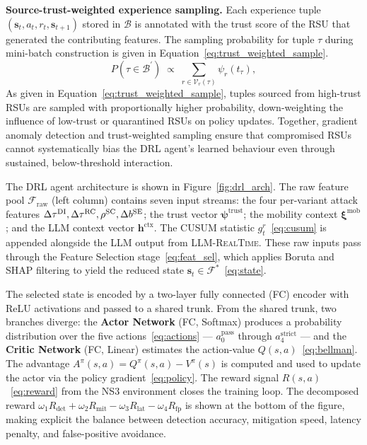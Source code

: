 \textbf{Source-trust-weighted experience sampling.}
Each experience tuple $(\mathbf{s}_t, a_t, r_t,
\mathbf{s}_{t+1})$ stored in $\mathcal{B}$ is annotated with
the trust score of the RSU that generated the contributing
features. The sampling probability for tuple $\tau$ during
mini-batch construction is given in
Equation~\eqref{eq:trust_weighted_sample}.
%
\begin{equation}
  P(\tau \in \mathcal{B}^{\prime}) \;\propto\;
    \sum_{r \in \mathcal{V}_r(\tau)} \psi_r(t_\tau),
  \label{eq:trust_weighted_sample}
\end{equation}
%
As given in Equation~\eqref{eq:trust_weighted_sample}, tuples
sourced from high-trust RSUs are sampled with proportionally
higher probability, down-weighting the influence of low-trust
or quarantined RSUs on policy updates. Together, gradient
anomaly detection and trust-weighted sampling ensure that
compromised RSUs cannot systematically bias the DRL agent's
learned behaviour even through sustained, below-threshold
interaction.




The DRL agent architecture is shown in
Figure~\ref{fig:drl_arch}. The raw feature pool
$\mathcal{F}_{\mathrm{raw}}$ (left column) contains seven input
streams: the four per-variant attack features
$\Delta\tau^{\mathrm{DI}}, \Delta\tau^{\mathrm{RC}},
\rho^{\mathrm{SC}}, \\\Delta b^{\mathrm{SE}}$; the trust vector
$\boldsymbol{\psi}^{\mathrm{trust}}$; the mobility context
$\boldsymbol{\xi}^{\mathrm{mob}}$; and the LLM context vector
$\mathbf{h}^{\mathrm{ctx}}$. The CUSUM statistic
$g_t^r$~\eqref{eq:cusum} is appended alongside the LLM output
from \textsc{LLM-RealTime}. These raw inputs pass through the
Feature Selection stage~\eqref{eq:feat_sel}, which applies
Boruta and SHAP filtering to yield the reduced state
$\mathbf{s}_t \in \mathcal{F}^*$~\eqref{eq:state}.

The selected state is encoded by a two-layer fully connected
(FC) encoder with ReLU activations and passed to a shared
trunk. From the shared trunk, two branches diverge: the
\textbf{Actor Network} (FC, Softmax) produces a probability
distribution over the five actions~\eqref{eq:actions} ---
$a_0^{\mathrm{pass}}$ through $a_4^{\mathrm{strict}}$ --- and
the \textbf{Critic Network} (FC, Linear) estimates the
action-value $Q(s,a)$~\eqref{eq:bellman}. The advantage
$A^\pi(s,a) = Q^\pi(s,a) - V^\pi(s)$ is computed and used to
update the actor via the policy gradient~\eqref{eq:policy}.
The reward signal $R(s,a)$~\eqref{eq:reward} from the NS3
environment closes the training loop. The decomposed reward
$\omega_1 R_{\mathrm{det}} + \omega_2 R_{\mathrm{mit}} -
\omega_3 R_{\mathrm{lat}} - \omega_4 R_{\mathrm{fp}}$ is shown
at the bottom of the figure, making explicit the balance
between detection accuracy, mitigation speed, latency penalty,
and false-positive avoidance.%


